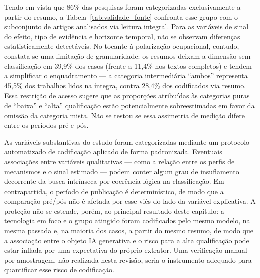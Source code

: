 Tendo em vista que 86\% das pesquisas foram categorizadas exclusivamente a partir do resumo, a Tabela~\ref{tab:validade_fonte} confronta esse grupo com o subconjunto de artigos analisados via leitura integral. Para as variáveis de sinal do efeito, tipo de evidência e horizonte temporal, não se observam diferenças estatisticamente detectáveis. No tocante à polarização ocupacional, contudo, constata-se uma limitação de granularidade: os resumos deixam a dimensão sem classificação em 39,9\% dos casos (frente a 11,4\% nos textos completos) e tendem a simplificar o enquadramento --- a categoria intermediária ``ambos'' representa 45,5\% dos trabalhos lidos na íntegra, contra 28,4\% dos codificados via resumo. Essa restrição de acesso sugere que as proporções atribuídas às categorias puras de ``baixa'' e ``alta'' qualificação estão potencialmente sobreestimadas em favor da omissão da categoria mista. Não se testou se essa assimetria de medição difere entre os períodos pré e pós.

\begin{table}[htbp]
\centering
\caption{Validade da extração: estudos lidos pelo resumo vs.\ em texto completo.}
\label{tab:validade_fonte}

\end{table}

As variáveis substantivas do estudo foram categorizadas mediante um protocolo automatizado de codificação aplicado de forma padronizada. Eventuais associações entre variáveis qualitativas --- como a relação entre os perfis de mecanismos e o sinal estimado --- podem conter algum grau de insuflamento decorrente da busca intrínseca por coerência lógica na classificação. Em contrapartida, o período de publicação é determinístico, de modo que a comparação pré/pós não é afetada por esse viés do lado da variável explicativa. A proteção não se estende, porém, ao principal resultado deste capítulo: a tecnologia em foco e o grupo atingido foram codificados pelo mesmo modelo, na mesma passada e, na maioria dos casos, a partir do mesmo resumo, de modo que a associação entre o objeto IA generativa e o risco para a alta qualificação pode estar inflada por uma expectativa do próprio extrator. Uma verificação manual por amostragem, não realizada nesta revisão, seria o instrumento adequado para quantificar esse risco de codificação.

